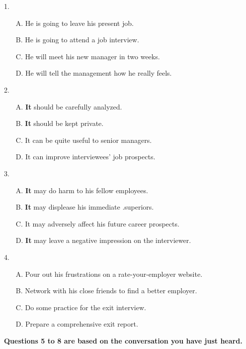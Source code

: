 \documentclass[UTF8,11pt]{ctexart}
\begin{document}
1.


\begin{itemize}[leftmargin=2em,itemsep=.2em,topsep=.4em]\item[A.] He is going to leave his present job.
\item[B.] He is going to attend a job interview.
\item[C.] He will meet his new manager in two weeks.
\item[D.] He will tell the management how he really feels.
\end{itemize}

2.


\begin{itemize}[leftmargin=2em,itemsep=.2em,topsep=.4em]\item[A.] \textbf{It }should be carefully analyzed.
\item[B.] \textbf{It }should be kept private.
\item[C.] It can be quite useful to senior managers.
\item[D.] It can improve interviewees' job prospects.
\end{itemize}

3.


\begin{itemize}[leftmargin=2em,itemsep=.2em,topsep=.4em]\item[A.] \textbf{It }may do harm to his fellow employees.
\item[B.] \textbf{It }may displease his immediate .superiors.
\item[C.] It may adversely affect his future career prospects.
\item[D.] \textbf{It }may leave a negative impression on the interviewer.
\end{itemize}

4.


\begin{itemize}[leftmargin=2em,itemsep=.2em,topsep=.4em]\item[A.] Pour out his frustrations on a rate-your-employer website.
\item[B.] Network with his close friends to find a better employer.
\item[C.] Do some practice for the exit interview.
\item[D.] Prepare a comprehensive exit report.
\end{itemize}

\textbf{Questions 5 to 8 are based on the conversation you have just heard.}
\end{document}
